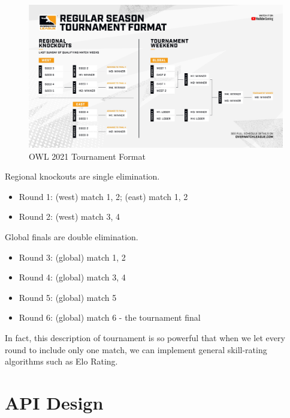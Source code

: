\begin{figure}[H]
    \centering
    \includegraphics[width=\textwidth]{images/owl-tournament-format.png}
    \caption{OWL 2021 Tournament Format}
    \label{fig:owl-tournament-format}
\end{figure}

Regional knockouts are single elimination.
\begin{itemize}
    \item Round 1: (west) match 1, 2; (east) match 1, 2
    \item Round 2: (west) match 3, 4
\end{itemize}

Global finals are double elimination.
\begin{itemize}
    \item Round 3: (global) match 1, 2
    \item Round 4: (global) match 3, 4
    \item Round 5: (global) match 5
    \item Round 6: (global) match 6 - the tournament final
\end{itemize}

In fact, this description of tournament is so powerful that when we let every round to include only one match, we can implement general skill-rating algorithms such as Elo Rating.

\section{API Design}
\label{as:matchmaking-api_design}

